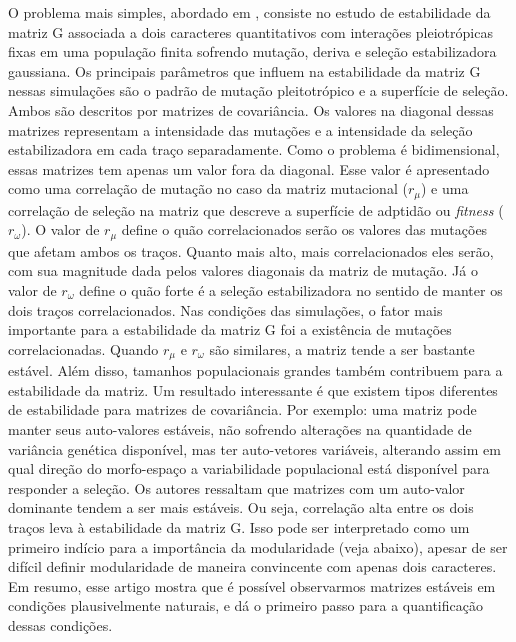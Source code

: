 O problema mais simples, abordado em \cite{Jones2003}, consiste no
estudo de estabilidade da matriz G associada a dois caracteres
quantitativos com interações pleiotrópicas fixas em uma população finita
sofrendo mutação, deriva e seleção estabilizadora gaussiana. 
Os principais parâmetros que influem na estabilidade da matriz G nessas
simulações são o padrão de mutação pleitotrópico e a superfície de
seleção. 
Ambos são descritos por matrizes de covariância. 
Os valores na diagonal dessas matrizes representam a intensidade das
mutações e a intensidade da seleção estabilizadora em cada traço
separadamente. 
Como o problema é bidimensional, essas matrizes tem apenas um valor fora
da diagonal. 
Esse valor é apresentado como uma correlação de mutação no caso da
matriz mutacional ($r_\mu$) e uma correlação de seleção na matriz que
descreve a superfície de adptidão ou {\it fitness} ($r_\omega$). 
O valor de $r_\mu$ define o quão correlacionados serão os valores das
mutações que afetam ambos os traços. 
Quanto mais alto, mais correlacionados eles serão, com sua magnitude
dada pelos valores diagonais da matriz de mutação. 
Já o valor de $r_\omega$ define o quão forte é a seleção estabilizadora
no sentido de manter os dois traços correlacionados. 
Nas condições das simulações, o fator mais importante para a
estabilidade da matriz G foi a existência de mutações correlacionadas. 
Quando $r_\mu$ e $r_\omega$ são similares, a matriz tende a ser bastante
estável. 
Além disso, tamanhos populacionais grandes também contribuem para a
estabilidade da matriz.
Um resultado interessante é que existem tipos diferentes de estabilidade
para matrizes de covariância. 
Por exemplo: uma matriz pode manter seus auto-valores estáveis, não
sofrendo alterações na quantidade de variância genética disponível, mas
ter auto-vetores variáveis, alterando assim em qual direção do
morfo-espaço a variabilidade populacional está disponível para responder
a seleção. 
Os autores ressaltam que matrizes com um auto-valor dominante tendem a
ser mais estáveis. 
Ou seja, correlação alta entre os dois traços leva à estabilidade da
matriz G. 
Isso pode ser interpretado como um primeiro indício para a importância
da modularidade (veja abaixo), apesar de ser difícil definir
modularidade de maneira convincente com apenas dois caracteres. 
Em resumo, esse artigo mostra que é possível observarmos matrizes
estáveis em condições plausivelmente naturais, e dá o primeiro passo
para a quantificação dessas condições.

